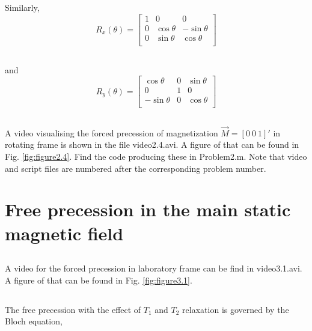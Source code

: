 \documentclass[a4paper,11pt]{article}
\begin{document}
\subsection{}
Similarly,
\begin{equation}
    R_x(\theta) = 
    \begin{bmatrix}
        1 & 0 & 0 \\
        0 & \cos \theta & -\sin \theta \\
        0 & \sin \theta & \cos \theta \\
    \end{bmatrix}
\end{equation}

\subsection{}
and
\begin{equation}
    R_y(\theta) = 
    \begin{bmatrix}
        \cos \theta & 0 & \sin \theta \\
        0 & 1 & 0 \\
        -\sin \theta & 0 & \cos \theta \\
    \end{bmatrix}
\end{equation}

\subsection{}
A video visualising the forced precession of magnetization $\overrightarrow{M}=\left[0\ 0\ 1\right]'$ in rotating frame is shown in the file video2.4.avi.
A figure of that can be found in Fig. \ref{fig:figure2.4}.
Find the code producing these in Problem2.m.
Note that video and script files are numbered after the corresponding problem number. 

\section{Free precession in the main static magnetic field}
\subsection{}
A video for the forced precession in laboratory frame can be find in video3.1.avi.
A figure of that can be found in Fig. \ref{fig:figure3.1}.

\subsection{}
The free precession with the effect of $T_1$ and $T_2$ relaxation is governed by the Bloch equation,
\end{document}
